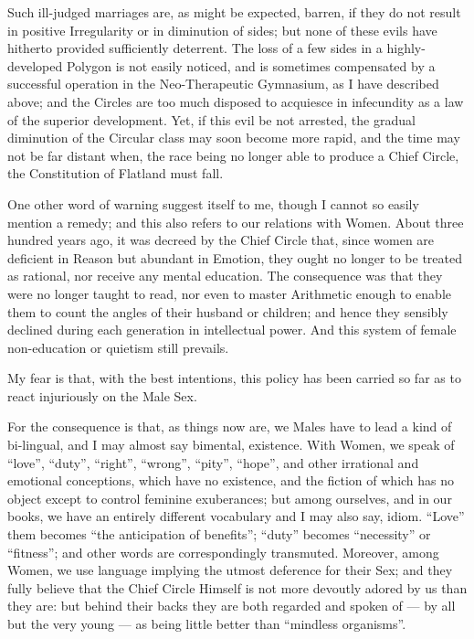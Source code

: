 \documentclass[12pt, a4paper, twoside]{memoir}
\begin{document}
Such ill-judged marriages are, as might be expected, barren, if they do not
result in positive Irregularity or in diminution of sides; but none of these
evils have hitherto provided sufficiently deterrent. The loss of a few sides
in a highly-developed Polygon is not easily noticed, and is sometimes
compensated by a successful operation in the Neo-Therapeutic Gymnasium, as I
have described above; and the Circles are too much disposed to acquiesce in
infecundity as a law of the superior development. Yet, if this evil be not
arrested, the gradual diminution of the Circular class may soon become more
rapid, and the time may not be far distant when, the race being no longer able
to produce a Chief Circle, the Constitution of Flatland must fall.

One other word of warning suggest itself to me, though I cannot so easily
mention a remedy; and this also refers to our relations with Women. About
three hundred years ago, it was decreed by the Chief Circle that, since women
are deficient in Reason but abundant in Emotion, they ought no longer to be
treated as rational, nor receive any mental education. The consequence was
that they were no longer taught to read, nor even to master Arithmetic enough
to enable them to count the angles of their husband or children; and hence
they sensibly declined during each generation in intellectual power. And this
system of female non-education or quietism still prevails.

My fear is that, with the best intentions, this policy has been carried so far
as to react injuriously on the Male Sex.

For the consequence is that, as things now are, we Males have to lead a kind
of bi-lingual, and I may almost say bimental, existence. With Women, we speak
of ``love'', ``duty'', ``right'', ``wrong'', ``pity'', ``hope'', and other irrational and
emotional conceptions, which have no existence, and the fiction of which has
no object except to control feminine exuberances; but among ourselves, and in
our books, we have an entirely different vocabulary and I may also say, idiom.
``Love'' them becomes ``the anticipation of benefits''; ``duty'' becomes ``necessity''
or ``fitness''; and other words are correspondingly transmuted. Moreover, among
Women, we use language implying the utmost deference for their Sex; and they
fully believe that the Chief Circle Himself is not more devoutly adored by us
than they are: but behind their backs they are both regarded and spoken of ---
by all but the very young --- as being little better than ``mindless organisms''.
\end{document}
